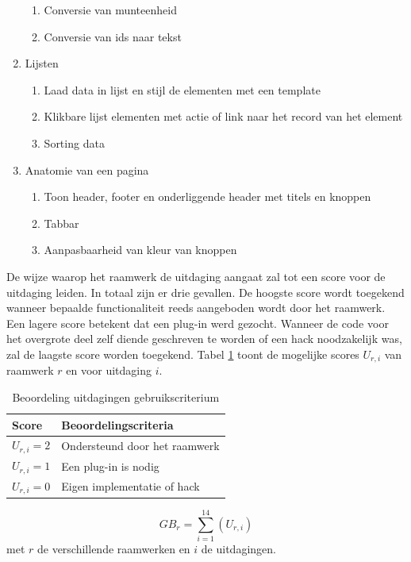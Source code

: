 \begin{enumerate}[label*=U \arabic*.]
\begin{enumerate}[label*=\arabic*]
\item Conversie van munteenheid
\item Conversie van ids naar tekst	
\end{enumerate}
\item \label{challenge:lijsten}Lijsten
\begin{enumerate}[label*=\arabic*]
\item Laad data in lijst en stijl de elementen met een template
\item Klikbare lijst elementen met actie of link naar het record van het element
\item Sorting data
\end{enumerate}
\item \label{challenge:anatomie}Anatomie van een pagina
\begin{enumerate}[label*=\arabic*]
 \item Toon header,  footer en onderliggende header met titels en knoppen
 \item Tabbar
 \item Aanpasbaarheid van kleur van knoppen
 \end{enumerate}
\end{enumerate} 

De wijze waarop het raamwerk de uitdaging aangaat zal tot een score voor de uitdaging leiden.
In totaal zijn er drie gevallen.
De hoogste score wordt toegekend wanneer bepaalde functionaliteit reeds aangeboden wordt door het raamwerk. 
Een lagere score betekent dat een plug-in werd gezocht. 
Wanneer de code voor het overgrote deel zelf diende geschreven te worden of een hack noodzakelijk was, zal de laagste score worden toegekend.
Tabel \ref{tabel:scores-uitdagingen} toont de mogelijke scores $U_{r,i}$ van raamwerk $r$ en voor uitdaging $i$.
\begin{table}[h]	
  \centering
  \begin{tabular}{ll}
    \toprule
    \textbf{Score} & \textbf{Beoordelingscriteria}\\
    \midrule
    $U_{r,i} = 2$ & Ondersteund door het raamwerk\\
    $U_{r,i} = 1$ & Een plug-in is nodig\\
    $U_{r,i} = 0$ & Eigen implementatie of hack\\
    \bottomrule
  \end{tabular}
  \caption{Beoordeling uitdagingen gebruikscriterium}
  \label{tabel:scores-uitdagingen}
\end{table}
\begin{equation}
  GB_r = \sum_{i=1}^{14}{\left(U_{r,i}\right)}
  \label{eq:gebruik}
\end{equation}
met $r$ de verschillende raamwerken en $i$ de uitdagingen.

